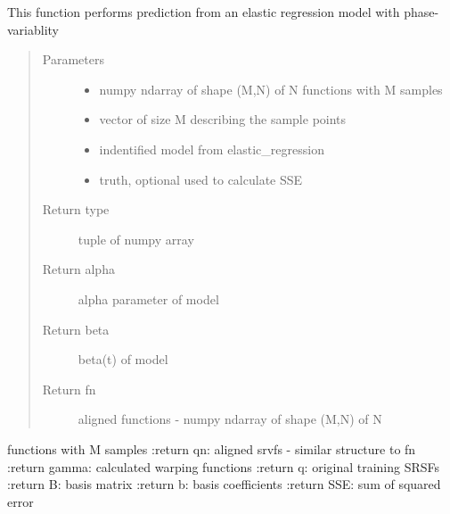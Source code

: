 \documentclass[letterpaper,10pt,english]{sphinxmanual}
\begin{document}
\begin{fulllineitems}
\label{\detokenize{regression:regression.elastic_prediction}}
This function performs prediction from an elastic regression model
with phase-variablity
\begin{quote}\begin{description}
\item[{Parameters}] \leavevmode\begin{itemize}
\item {} 
 \textendash{} numpy ndarray of shape (M,N) of N functions with M samples

\item {} 
 \textendash{} vector of size M describing the sample points

\item {} 
 \textendash{} indentified model from elastic\_regression

\item {} 
 \textendash{} truth, optional used to calculate SSE

\end{itemize}

\item[{Return type}] \leavevmode
tuple of numpy array

\item[{Return alpha}] \leavevmode
alpha parameter of model

\item[{Return beta}] \leavevmode
beta(t) of model

\item[{Return fn}] \leavevmode
aligned functions - numpy ndarray of shape (M,N) of N

\end{description}\end{quote}

functions with M samples
:return qn: aligned srvfs - similar structure to fn
:return gamma: calculated warping functions
:return q: original training SRSFs
:return B: basis matrix
:return b: basis coefficients
:return SSE: sum of squared error

\end{fulllineitems}
\end{document}
